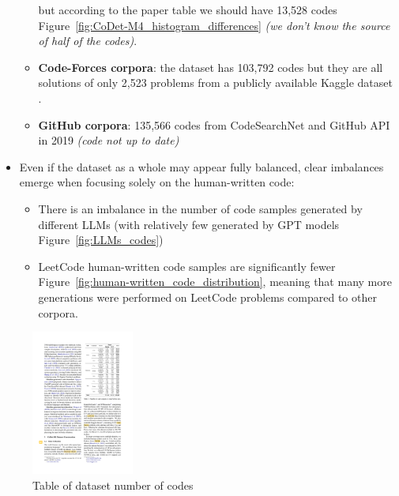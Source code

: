 \begin{itemize}
\begin{itemize}
            but according to the paper table we should have 13,528 codes Figure~\ref{fig:CoDet-M4_histogram_differences} 
            \textit{(we don't know the source of half of the codes)}.
            \item \textbf{Code-Forces corpora}: the dataset has 103,792 codes but they are all
            solutions of only 2,523 problems from 
            a publicly available Kaggle dataset \cite{CodeforcesKaggle}.
            \item \textbf{GitHub corpora}: 135,566 codes from 
            CodeSearchNet \cite{husain2019codesearchnet} 
            and GitHub API in 2019 \textit{(code not up to date)}
        \end{itemize}
    \item Even if the dataset as a whole may appear fully balanced, 
    clear imbalances emerge when focusing solely on the human-written code:
            \begin{itemize}
            \item There is an imbalance in the number of code samples generated by 
            different LLMs (with relatively few generated by GPT models 
            Figure~\ref{fig:LLMs_codes})
            \item LeetCode human-written code samples are significantly 
            fewer Figure~\ref{fig:human-written_code_distribution}, meaning that many more generations were performed on 
            LeetCode problems compared to other corpora.
    \end{itemize}
\end{itemize}


\clearpage %
\begin{figure}[ht]
    \centering
    \includegraphics[width=0.3\textwidth]{img/CoDet-M4/tab1.pdf}
    \caption{Table of dataset number of codes}
    \label{fig:tabella-risultati}
\end{figure}

